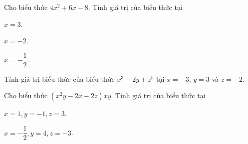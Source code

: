 \begin{bt}%
	Cho biểu thức $4x^2+6x-8$. Tính giá trị của biểu thức tại
	\begin{enumEX}{3}
		\item $x=3$.
		\item $x=-2$.
		\item $x=-\dfrac{1}{2}$.
	\end{enumEX}
\end{bt}

\begin{bt}%
	Tính giá trị biểu thức của biểu thức $x^3-2y+z^5$ tại $x=-3$, $y=3$ và $z=-2$.
\end{bt}

\begin{bt}%
	Cho biểu thức $(x^2y-2x-2z)xy$. Tính giá trị của biểu thức tại
	\begin{enumEX}{2}
		\item $x=1,y=-1,z=3$.
		\item $x=-\dfrac{1}{2},y=4,z=-3$.
	\end{enumEX}
\end{bt}

